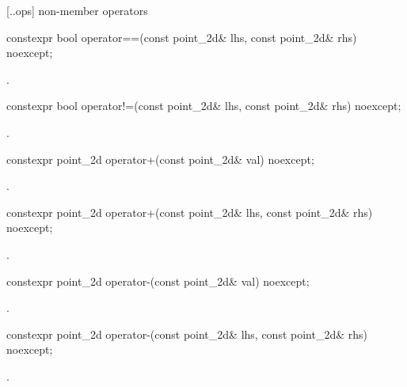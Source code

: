  [\iotwod.\pointtwod.ops] { non-member operators}

%
\begin{itemdecl}
constexpr bool operator==(const point_2d& lhs, const point_2d& rhs) noexcept;
\end{itemdecl}
\begin{itemdescr}
\pnum
\returns
{}.
\end{itemdescr}

%
\begin{itemdecl}
constexpr bool operator!=(const point_2d& lhs, const point_2d& rhs) noexcept;
\end{itemdecl}
\begin{itemdescr}
\pnum
\returns
{}.
\end{itemdescr}

%
\begin{itemdecl}
constexpr point_2d operator+(const point_2d& val) noexcept;
\end{itemdecl}
\begin{itemdescr}
\pnum
\returns
{}.
\end{itemdescr}

%
\begin{itemdecl}
constexpr point_2d operator+(const point_2d& lhs, const point_2d& rhs) 
  noexcept;
\end{itemdecl}
\begin{itemdescr}
\pnum
\returns
{}.
\end{itemdescr}

%
\begin{itemdecl}
constexpr point_2d operator-(const point_2d& val) noexcept;
\end{itemdecl}
\begin{itemdescr}
\pnum
\returns
{}.
\end{itemdescr}

%
\begin{itemdecl}
constexpr point_2d operator-(const point_2d& lhs, const point_2d& rhs) 
  noexcept;
\end{itemdecl}
\begin{itemdescr}
\pnum
\returns
{}.
\end{itemdescr}


